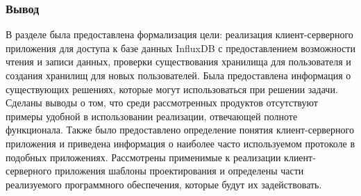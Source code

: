 \subsubsection*{Вывод}
В разделе была предоставлена формализация цели: реализация клиент-серверного приложения для доступа к базе данных InfluxDB с предоставлением возможности чтения и записи данных, проверки существования хранилища для пользователя и создания хранилищ для новых пользователей.
Была предоставлена информация о существующих решениях, которые могут использоваться при решении задачи. Сделаны выводы о том, что среди рассмотренных продуктов отсутствуют примеры удобной в использовании реализации, отвечающей полноте функционала.
Также было предоставлено определение понятия клиент-серверного приложения и приведена информация о наиболее часто используемом протоколе в подобных приложениях. Рассмотрены применимые к реализации клиент-серверного приложения шаблоны проектирования и определены части реализуемого программного обеспечения, которые будут их задействовать.

\pagebreak